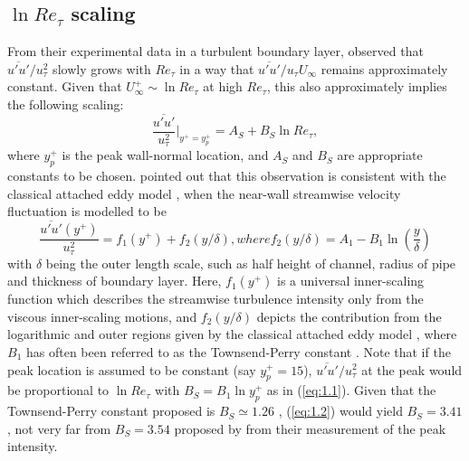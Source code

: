 \documentclass{jfm}
\begin{document}
\subsection{$\ln Re_\tau$ scaling}\label{sec:1.1}
From their experimental data in a turbulent boundary layer, \cite{deGraaff2000} observed that $\overline{u'u'}/u_\tau^2$ slowly grows with $Re_\tau$ in a way that $\overline{u'u'}/u_\tau U_{\infty}$ remains approximately constant. Given that $U_{\infty}^+ \sim \ln Re_\tau$ at high $Re_\tau$, this also approximately implies the following scaling:
\begin{equation}\label{eq:1.1}
\frac{\overline{u'u'}}{u_\tau^2}\Big|_{y^+=y^+_{p}}=A_{S}+B_S\ln Re_\tau,
\end{equation}
where $y^+_{p}$ is the peak wall-normal location, and $A_{S}$ and $B_S$ are appropriate constants to be chosen. \cite{Marusic2003} pointed out that this observation is consistent with the classical attached eddy model \cite[]{Townsend1976,Perry1982,Perry1986}, when the near-wall streamwise velocity fluctuation is modelled to be
\begin{subequations}\label{eq:1.2}
\begin{equation}\label{eq:1.2a}
\frac{\overline{u'u'}(y^+)}{u_\tau^2}=f_1(y^+)+f_2(y/\delta),
\end{equation}
where
\begin{equation}\label{eq:1.2b}
f_2(y/\delta)=A_1-B_1 \ln \left(\frac{y}{\delta}\right)
\end{equation}
\end{subequations}
with $\delta$ being the outer length scale, such as half height of channel, radius of pipe and thickness of boundary layer. Here, $f_1(y^+)$ is a universal inner-scaling function which describes the streamwise turbulence intensity only from the viscous inner-scaling motions, and $f_2(y/\delta)$ depicts the contribution from the logarithmic and outer regions given by the classical attached eddy model \cite[]{Townsend1976}, where $B_1$ has often been referred to as the Townsend-Perry constant \cite[]{Marusic2013}. Note that if the peak location is assumed to be constant (say $y_{p}^+=15$), $\overline{u'u'}/{u_\tau^2}$ at the peak would be proportional to $\ln Re_\tau$ with $B_S=B_1 \ln y_p^+$ as in (\ref{eq:1.1}). Given that the Townsend-Perry constant proposed is $B_S\simeq 1.26$ \cite[e.g.][]{Marusic2013}, (\ref{eq:1.2}) would yield $B_S=3.41$, not very far from $B_S=3.54$ proposed by \cite{Samie2018} from their measurement of the peak intensity.
\end{document}
